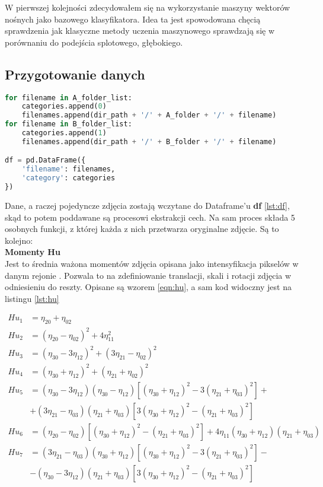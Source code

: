 W  pierwszej kolejności zdecydowałem się na wykorzystanie maszyny wektorów nośnych jako bazowego klasyfikatora. Idea ta jest spowodowana chęcią sprawdzenia jak klasyczne metody uczenia maszynowego sprawdzają się w porównaniu do podejścia splotowego, głębokiego.

\subsection{Przygotowanie danych}

\begin{lstlisting}[language=Python, caption={Stworzenie ramki danych \textbf{df}}, captionpos=b, label={lst:df}]
for filename in A_folder_list:
	categories.append(0)
	filenames.append(dir_path + '/' + A_folder + '/' + filename)
for filename in B_folder_list:
	categories.append(1)
	filenames.append(dir_path + '/' + B_folder + '/' + filename)

df = pd.DataFrame({
	'filename': filenames,
	'category': categories
})
\end{lstlisting}


Dane, a raczej pojedyncze zdjęcia zostają wczytane do Dataframe'u \textbf{df} \ref{lst:df}, skąd to potem poddawane są procesowi ekstrakcji cech. Na sam proces składa 5 osobnych funkcji, z której każda z nich przetwarza oryginalne zdjęcie. Są to kolejno:\\

\textbf{Momenty Hu} \\

Jest to  średnia ważona momentów zdjęcia opisana jako intensyfikacja pikselów w danym rejonie \cite{hu}. Pozwala to na zdefiniowanie translacji, skali i rotacji zdjęcia w odniesieniu do reszty. Opisane są wzorem \ref{eqn:hu}, a sam kod widoczny jest na listingu \ref{lst:hu}

\begin{equation}
	\begin{split}
		Hu_{1} &= \eta_{20} + \eta_{02} \\
		Hu_{2} &= (\eta_{20} - \eta_{02})^2 + 4\eta^2_{11} \\
		Hu_{3} &= (\eta_{30} - 3\eta_{12})^2 + (3\eta_{21} - \eta_{02})^2 \\
		Hu_{4} &= (\eta_{30} + \eta_{12})^2 + (\eta_{21} + \eta_{02})^2 \\
		Hu_{5} &= (\eta_{30} - 3\eta_{12})(\eta_{30} - \eta_{12})\left [ (\eta_{30} + \eta_{12})^2 - 3(\eta_{21} + \eta_{03})^2 \right ] +\\
		 &+ (3\eta_{21} - \eta_{03})(\eta_{21}+\eta_{03})\left [3(\eta_{30} + \eta_{12})^2-(\eta_{21} + \eta_{03})^2 \right ] \\
		 Hu_{6} &= (\eta_{20}-\eta_{02})\left [ (\eta_{30} + \eta_{12})^2 - (\eta_{21} + \eta_{03})^2\right ] +4\eta_{11}(\eta_{30}+\eta_{12})(\eta_{21} + \eta_{03}) \\
		 Hu_{7} &= (3\eta_{21} - \eta_{03})(\eta_{30}+\eta_{12})\left [(\eta_{30}+\eta_{12})^2-3(\eta_{21}+\eta_{03})^2 \right ] -\\
		  &- (\eta_{30}-3\eta_{12})(\eta_{21} + \eta_{03}) \left [3(\eta_{30}+\eta_{12})^2-(\eta_{21} + \eta_{03})^2 \right ]
	\end{split}
	\label{eqn:hu}
\end{equation}

